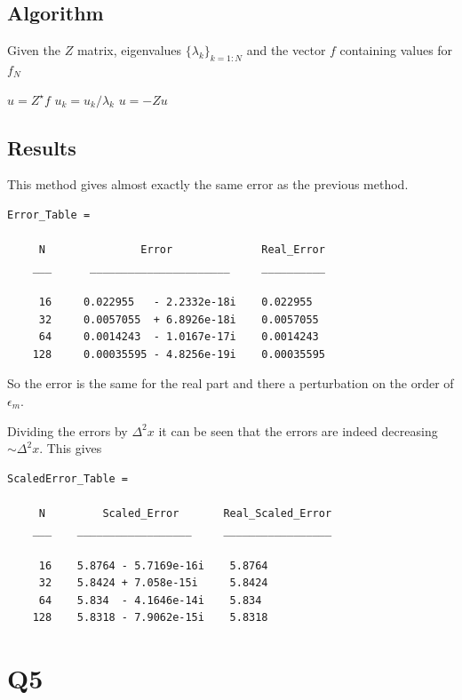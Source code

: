 \documentclass{article}
\begin{document}
\subsection{Algorithm}

Given the $Z$ matrix, eigenvalues $\{\lambda_k\}_{k=1:N}$ and the vector $f$ containing values for $f_N$

\begin{algorithmic}
	\State $u = Z^\star f$
		\State $u_k = u_k / \lambda_k$
	\EndFor
	\State $u = - Z u$
\end{algorithmic}


\subsection{Results}

This method gives almost exactly the same error as the previous method.

\begin{verbatim}
Error_Table = 

     N               Error              Real_Error
    ___      ______________________     __________
 
     16     0.022955   - 2.2332e-18i    0.022955
     32     0.0057055  + 6.8926e-18i    0.0057055
     64     0.0014243  - 1.0167e-17i    0.0014243
    128     0.00035595 - 4.8256e-19i    0.00035595
\end{verbatim}

So the error is the same for the real part and there a perturbation on the order of $\epsilon_m$. 

Dividing the errors by $\Delta^2 x$ it can be seen that the errors are indeed decreasing $\sim \Delta^2 x$. This gives

\begin{verbatim}
ScaledError_Table = 

     N         Scaled_Error       Real_Scaled_Error
    ___    __________________     _________________

     16    5.8764 - 5.7169e-16i    5.8764           
     32    5.8424 + 7.058e-15i     5.8424           
     64    5.834  - 4.1646e-14i    5.834           
    128    5.8318 - 7.9062e-15i    5.8318           
\end{verbatim}

\newpage
\section{Q5}
\end{document}
